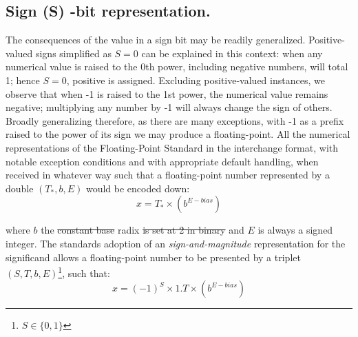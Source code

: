 \documentclass[7pt]{article}
\begin{document}
\subsection*{Sign (S) -bit representation.}
The consequences of the value in a sign bit may be readily generalized. Positive-valued signs simplified as $S= 0$ can be explained in this context: when any numerical value is raised to the 0th power, including negative numbers, will total 1; hence $S=0$, positive is assigned. Excluding positive-valued instances, we observe that when -1 is raised to the 1st power, the numerical value remains negative; multiplying any number by -1 will always change the sign of others. Broadly generalizing therefore, as there are many exceptions, with -1 as a prefix raised to the power of its sign we may produce a floating-point. All the numerical representations of the Floating-Point Standard in the interchange format, with notable exception conditions and with appropriate default handling, when received in whatever way such that a floating-point number represented by a double $(T_{*}, b, E)$ would be encoded down:
\begin{equation}
x = T_{*} \times (b^{E-bias})
\end{equation}

where $b$ the \st{constant base} radix \st{is set at 2 in binary} and $E$ is always a signed integer. The standards adoption of an \textit{sign-and-magnitude} representation for the significand  allows a floating-point number to be presented by a triplet $(S, T, b, E)$\footnote{$S \in \{0,1\}$ }, such that:
\begin{equation}
x = (-1)^{S}\times 1 . T \times (b^{E-bias})
\label{eq:IEEE754}
\end{equation}
\end{document}
